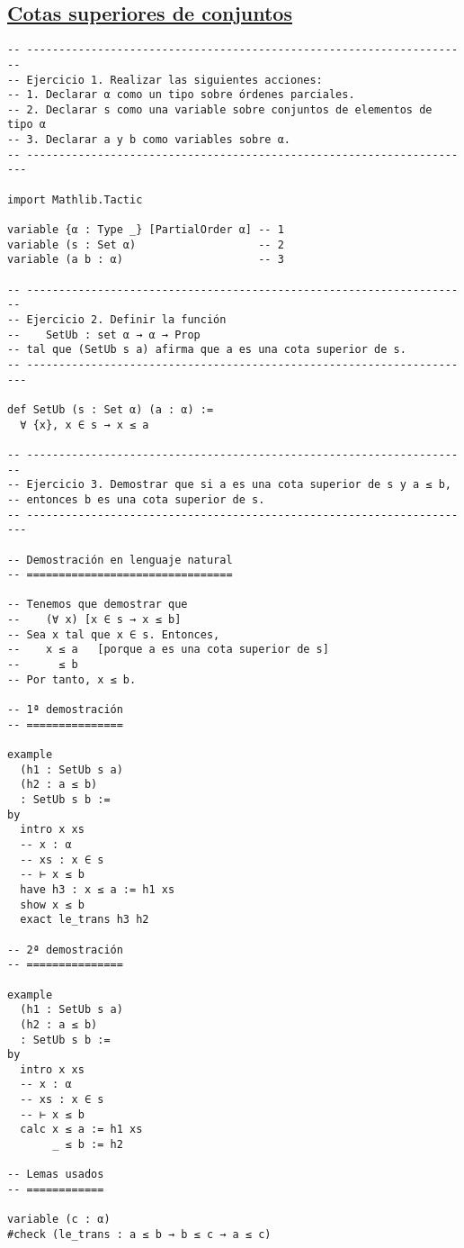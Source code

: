 \subsection{\href{./src/Logica/Cotas\_superiores\_de\_conjuntos.lean}{Cotas superiores de conjuntos}}
\label{sec:org2ac4e67}
\begin{verbatim}
-- ---------------------------------------------------------------------
-- Ejercicio 1. Realizar las siguientes acciones:
-- 1. Declarar α como un tipo sobre órdenes parciales.
-- 2. Declarar s como una variable sobre conjuntos de elementos de tipo α
-- 3. Declarar a y b como variables sobre α.
-- ----------------------------------------------------------------------

import Mathlib.Tactic

variable {α : Type _} [PartialOrder α] -- 1
variable (s : Set α)                   -- 2
variable (a b : α)                     -- 3

-- ---------------------------------------------------------------------
-- Ejercicio 2. Definir la función
--    SetUb : set α → α → Prop
-- tal que (SetUb s a) afirma que a es una cota superior de s.
-- ----------------------------------------------------------------------

def SetUb (s : Set α) (a : α) :=
  ∀ {x}, x ∈ s → x ≤ a

-- ---------------------------------------------------------------------
-- Ejercicio 3. Demostrar que si a es una cota superior de s y a ≤ b,
-- entonces b es una cota superior de s.
-- ----------------------------------------------------------------------

-- Demostración en lenguaje natural
-- ================================

-- Tenemos que demostrar que
--    (∀ x) [x ∈ s → x ≤ b]
-- Sea x tal que x ∈ s. Entonces,
--    x ≤ a   [porque a es una cota superior de s]
--      ≤ b
-- Por tanto, x ≤ b.

-- 1ª demostración
-- ===============

example
  (h1 : SetUb s a)
  (h2 : a ≤ b)
  : SetUb s b :=
by
  intro x xs
  -- x : α
  -- xs : x ∈ s
  -- ⊢ x ≤ b
  have h3 : x ≤ a := h1 xs
  show x ≤ b
  exact le_trans h3 h2

-- 2ª demostración
-- ===============

example
  (h1 : SetUb s a)
  (h2 : a ≤ b)
  : SetUb s b :=
by
  intro x xs
  -- x : α
  -- xs : x ∈ s
  -- ⊢ x ≤ b
  calc x ≤ a := h1 xs
       _ ≤ b := h2

-- Lemas usados
-- ============

variable (c : α)
#check (le_trans : a ≤ b → b ≤ c → a ≤ c)
\end{verbatim}

